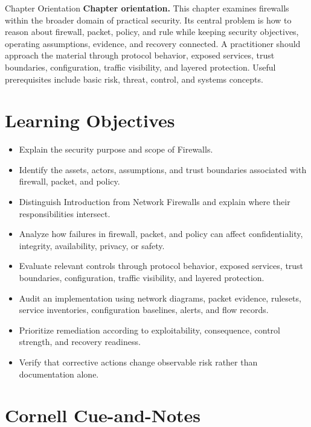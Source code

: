\documentclass[11pt,letterpaper]{article}
\title{\CornellDocumentTitle}
\author{}
\date{}
\begin{document}
\maketitle
\begin{CornellOverviewBox}{Chapter Orientation}
\textbf{Chapter orientation.} This chapter examines firewalls within the broader domain of practical security. Its central problem is how to reason about firewall, packet, policy, and rule while keeping security objectives, operating assumptions, evidence, and recovery connected. A practitioner should approach the material through protocol behavior, exposed services, trust boundaries, configuration, traffic visibility, and layered protection. Useful prerequisites include basic risk, threat, control, and systems concepts.
\end{CornellOverviewBox}
\section*{Learning Objectives}
\begin{itemize}
\item Explain the security purpose and scope of Firewalls.
\item Identify the assets, actors, assumptions, and trust boundaries associated with firewall, packet, and policy.
\item Distinguish Introduction from Network Firewalls and explain where their responsibilities intersect.
\item Analyze how failures in firewall, packet, and policy can affect confidentiality, integrity, availability, privacy, or safety.
\item Evaluate relevant controls through protocol behavior, exposed services, trust boundaries, configuration, traffic visibility, and layered protection.
\item Audit an implementation using network diagrams, packet evidence, rulesets, service inventories, configuration baselines, alerts, and flow records.
\item Prioritize remediation according to exploitability, consequence, control strength, and recovery readiness.
\item Verify that corrective actions change observable risk rather than documentation alone.
\end{itemize}
\section*{Cornell Cue-and-Notes}
\end{document}
